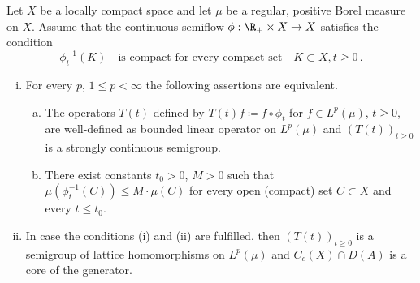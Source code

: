 \begin{proposition}\label{prop:c3-4.11}
Let $X$ be a locally compact space and let $\mu$ be a
regular, positive Borel measure on $X$. Assume that the continuous
semiflow $\phi : \R _+ \times X \to X$ satisfies the condition
\begin{equation}\label{eq:c3-4.12}
	\phi_t^{-1}(K) \quad \text{is compact for every compact set} \quad K \subset X , t \geq 0\,.
\end{equation}
%
%
\begin{enumerate}[(i)]
	\item		
	For every $p$, $1 \leq p < \infty$ the following assertions are equivalent.
		\begin{enumerate} [(a)]
			\item
			The operators $T(t)$ defined by $T(t)f \coloneqq  f \circ \phi_t$ for $f \in L^p(\mu)$,
			$t \geq 0$, are well-defined as bounded linear operator on $L^p(\mu)$
			and $(T(t))_{t \geq 0}$ is a strongly continuous semigroup.
			
			\item 
			There exist constants $t_0 > 0$, $M > 0$ such that 
			$\mu(\phi_t^{-1}(C)) \leq M \cdot \mu(C)$ for every open (compact) set $C \subset X$ and every $t \leq t_0$.
		\end{enumerate}
	
	\item 
	In case the conditions (i) and (ii) are fulfilled, then $(T(t))_{t \geq 0}$
	is a semigroup of lattice homomorphisms on $L^p(\mu)$ and $C_c(X) \cap D(A)$ is
	a core of the generator.
	
\end{enumerate}
\end{proposition}

